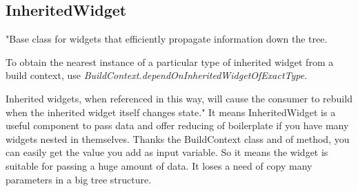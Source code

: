 \subsection{InheritedWidget}\label{subsec:inheritedwidget}
"Base class for widgets that efficiently propagate information down the tree.

To obtain the nearest instance of a particular type of inherited widget from a build context, use \textit{BuildContext.dependOnInheritedWidgetOfExactType}\cite{dependOnInheritedWidgetOfExactType}.

Inherited widgets, when referenced in this way, will cause the consumer to rebuild when the inherited widget itself changes state."\cite{inheritedWidget}
It means InheritedWidget is a useful component to pass data and offer reducing of boilerplate if you have many widgets nested in themselves.
Thanks the BuildContext class and of method, you can easily get the value you add as input variable.
So it means the widget is suitable for passing a huge amount of data.
It loses a need of copy many parameters in a big tree structure.
